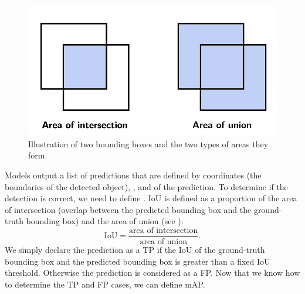 \begin{figure}[H]
    \centering
    \includegraphics[width=0.6\linewidth]{Sources/Figures/iou.png}
    \caption{Illustration of two bounding boxes and the two types of areas they
        form.}
    \label{fig:iou}
\end{figure}

Models output a list of predictions that are defined by 
coordinates (the boundaries of the detected object), , and
 of the prediction. To determine if the detection is
correct, we need to define . IoU is
defined as a proportion of the area of intersection (overlap between the
predicted bounding box and the ground-truth bounding box) and the area of union
(see ):
$$
    \text{IoU} = \frac{\text{area of intersection}}{\text{area of union}}.
$$
We simply declare the prediction as a TP if the IoU of the ground-truth bounding
box and the predicted bounding box is greater than a fixed IoU threshold.
Otherwise the prediction is considered as a FP. Now that we know how to determine
the TP and FP cases, we can define mAP.


